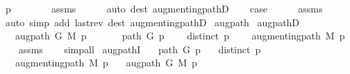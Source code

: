 \begin{isabellebody}
\ {\isachardoublequoteopen}p\ {\isasymnoteq}\ {\isacharbrackleft}{\kern0pt}{\isacharbrackright}{\kern0pt}{\isachardoublequoteclose}\isanewline
\ \ \ \ \isamarkupfalse%
\ assms\isanewline
\ \ \ \ \isamarkupfalse%
\ {\isacharparenleft}{\kern0pt}auto\ dest{\isacharcolon}{\kern0pt}\ augmenting{\isacharunderscore}{\kern0pt}pathD{\isacharparenleft}{\kern0pt}{}{\isacharparenright}{\kern0pt}{\isacharparenright}{\kern0pt}\isanewline
\ \ \isamarkupfalse%
\ {\isacharquery}{\kern0pt}case\isanewline
\ \ \ \ \isamarkupfalse%
\ assms\isanewline
\ \ \ \ \isamarkupfalse%
\ {\isacharparenleft}{\kern0pt}auto\ simp\ add{\isacharcolon}{\kern0pt}\ last{\isacharunderscore}{\kern0pt}rev\ dest{\isacharcolon}{\kern0pt}\ augmenting{\isacharunderscore}{\kern0pt}pathD{\isacharparenleft}{\kern0pt}{}{\isacharparenright}{\kern0pt}{\isacharparenright}{\kern0pt}\isanewline
{}\isamarkupfalse%
%
\endisatagproof
{\isafoldproof}%
%
\isadelimproof
\isanewline
%
\endisadelimproof
%
\isadeliminvisible
\isanewline
%
\endisadeliminvisible
%
\isataginvisible
{}\isamarkupfalse%
\ augpath\isanewline
{}\isamarkupfalse%
\ augpathD{\isacharcolon}{\kern0pt}\isanewline
\ \ \ {\isachardoublequoteopen}augpath\ G\ M\ p{\isachardoublequoteclose}\isanewline
\ \ \isanewline
\ \ \ \ {\isachardoublequoteopen}path\ G\ p{\isachardoublequoteclose}\isanewline
\ \ \ \ {\isachardoublequoteopen}distinct\ p{\isachardoublequoteclose}\isanewline
\ \ \ \ {\isachardoublequoteopen}augmenting{\isacharunderscore}{\kern0pt}path\ M\ p{\isachardoublequoteclose}%
\endisataginvisible
{\isafoldinvisible}%
%
\isadeliminvisible
\isanewline
%
\endisadeliminvisible
%
\isadelimproof
\ \ %
\endisadelimproof
%
\isatagproof
{}\isamarkupfalse%
\ assms\isanewline
\ \ \isamarkupfalse%
\ simp{\isacharunderscore}{\kern0pt}all%
\endisatagproof
{\isafoldproof}%
%
\isadelimproof
\isanewline
%
\endisadelimproof
%
\isadeliminvisible
\isanewline
%
\endisadeliminvisible
%
\isataginvisible
{}\isamarkupfalse%
\ augpathI{\isacharcolon}{\kern0pt}\isanewline
\ \ \ {\isachardoublequoteopen}path\ G\ p{\isachardoublequoteclose}\isanewline
\ \ \ {\isachardoublequoteopen}distinct\ p{\isachardoublequoteclose}\isanewline
\ \ \ {\isachardoublequoteopen}augmenting{\isacharunderscore}{\kern0pt}path\ M\ p{\isachardoublequoteclose}\isanewline
\ \ \ {\isachardoublequoteopen}augpath\ G\ M\ p{\isachardoublequoteclose}%

\end{isabellebody}
